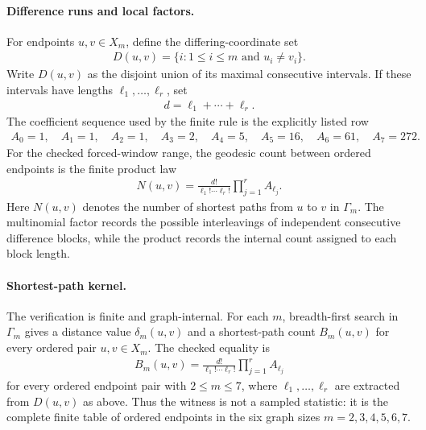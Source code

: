 \paragraph{Difference runs and local factors.}
For endpoints $u,v\in X_m$, define the differing-coordinate set
$$
\begin{aligned}
D(u,v)=\{i:1\leq i\leq m \text{ and } u_i\neq v_i\}.
\end{aligned}
$$
Write $D(u,v)$ as the disjoint union of its maximal consecutive intervals. If these intervals have lengths $\ell_1,\ldots,\ell_r$, set
$$
\begin{aligned}
d=\ell_1+\cdots+\ell_r.
\end{aligned}
$$
The coefficient sequence used by the finite rule is the explicitly listed row
$$
\begin{aligned}
A_0=1,\quad A_1=1,\quad A_2=1,\quad A_3=2,\quad A_4=5,\quad A_5=16,\quad A_6=61,\quad A_7=272.
\end{aligned}
$$
For the checked forced-window range, the geodesic count between ordered endpoints is the finite product law
$$
\begin{aligned}
N(u,v)=\frac{d!}{\ell_1!\cdots \ell_r!}\prod_{j=1}^{r} A_{\ell_j}.
\end{aligned}
$$
Here $N(u,v)$ denotes the number of shortest paths from $u$ to $v$ in $\Gamma_m$. The multinomial factor records the possible interleavings of independent consecutive difference blocks, while the product records the internal count assigned to each block length.

\paragraph{Shortest-path kernel.}
The verification is finite and graph-internal. For each $m$, breadth-first search in $\Gamma_m$ gives a distance value $\delta_m(u,v)$ and a shortest-path count $B_m(u,v)$ for every ordered pair $u,v\in X_m$. The checked equality is
$$
\begin{aligned}
B_m(u,v)=\frac{d!}{\ell_1!\cdots \ell_r!}\prod_{j=1}^{r} A_{\ell_j}
\end{aligned}
$$
for every ordered endpoint pair with $2\leq m\leq 7$, where $\ell_1,
\ldots,\ell_r$ are extracted from $D(u,v)$ as above. Thus the witness is not a sampled statistic: it is the complete finite table of ordered endpoints in the six graph sizes $m=2,3,4,5,6,7$.

